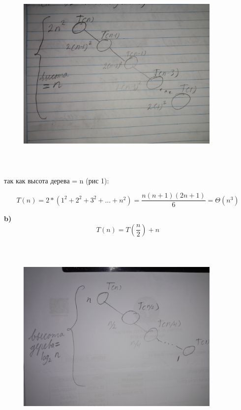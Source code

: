 \documentclass{article}
\begin{document}
\begin{figure}[h]
    \centering
    \includegraphics[width=10cm, height=10cm]{1.jpg}
    \caption{}
    \label{fig:my_label}
\end{figure}

\newpage

так как высота дерева = n (рис 1):

\begin{equation*}
    T(n) = 2*(1^2+2^2+3^2+...+n^2) = \dfrac{n(n+1)(2n+1)}{6} = \Theta(n^3) 
\end{equation*}

\bigskip
\bigskip
\textbf{b)}
\begin{equation*}
    T(n) = T(\frac{n}{2}) + n
\end{equation*}

\begin{figure}[h]
    \centering
    \includegraphics[width=10cm, height=10cm]{2.jpg}
    \caption{}
    \label{fig:my_label}
\end{figure}
\end{document}
